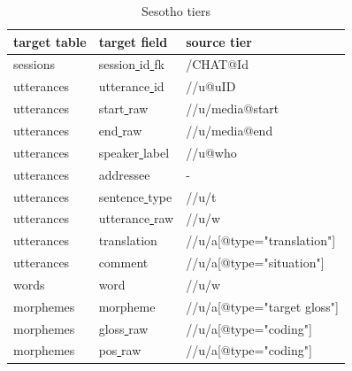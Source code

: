 \documentclass[a4paper, 11pt]{book}
\newcommand{\und}{\underline{{ }}\hspace{0.2mm}}	%
\begin{document}
\begin{table}[ht!]
	\centering
	\begin{tabular}{lll}
		\toprule
			\textbf{target table} & \textbf{target field} & \textbf{source tier} \\
		\midrule
			sessions 	& session\und id\und fk 	& /CHAT@Id \\
			utterances 	& utterance\und id	& //u@uID \\
			utterances 	& start\und raw		& //u/media@start \\
			utterances 	& end\und raw		& //u/media@end \\
			utterances 	& speaker\und label	& //u@who \\
			utterances 	& addressee			& - \\
			utterances 	& sentence\und type	& //u/t \\
			utterances 	& utterance\und raw	& //u/w \\
			utterances 	& translation		& //u/a[@type="translation"] \\
			utterances 	& comment			& //u/a[@type="situation"] \\

			words	 	& word		& //u/w \\
			morphemes	& morpheme			& //u/a[@type="target gloss"] \\
			morphemes	& gloss\und raw		& //u/a[@type="coding"] \\
			morphemes	& pos\und raw		& //u/a[@type="coding"] \\

		\bottomrule
	\end{tabular}
	\caption{Sesotho tiers}
	\label{tab:Sesotho tiers}
\end{table}
\end{document}

